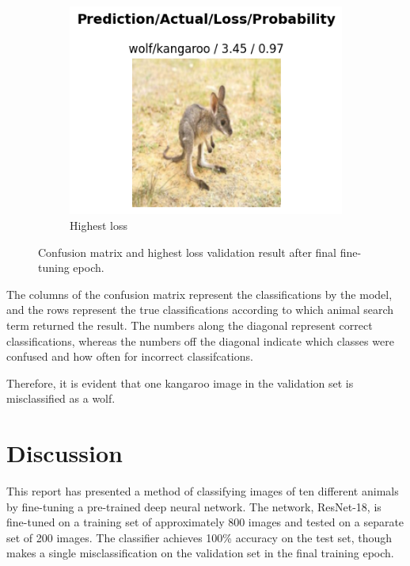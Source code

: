 \begin{figure}[ht]
\begin{subfigure}[t]{0.45\textwidth}
    \includegraphics[width=\textwidth]{images/q2_validation_top_loss.png}
    \caption{Highest loss}
    \label{fig:validation_top_loss}
  \end{subfigure}
  \caption{Confusion matrix and highest loss validation result after final fine-tuning epoch.}
\end{figure}

The columns of the confusion matrix represent the classifications by the model, and the rows represent the true classifications according to which animal search term returned the result. The numbers along the diagonal represent correct classifications, whereas the numbers off the diagonal indicate which classes were confused and how often for incorrect classifcations.

Therefore, it is evident that one kangaroo image in the validation set is misclassified as a wolf.

\newpage
\section{Discussion}

This report has presented a method of classifying images of ten different animals by fine-tuning a pre-trained deep neural network. The network, ResNet-18, is fine-tuned on a training set of approximately 800 images and tested on a separate set of 200 images. The classifier achieves 100\% accuracy on the test set, though makes a single misclassification on the validation set in the final training epoch.


